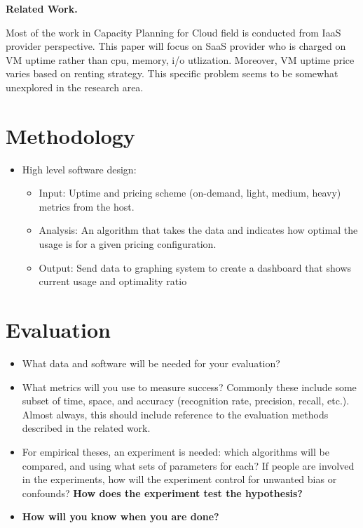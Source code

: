 \documentclass[11pt]{artikel3}
\begin{document}
{\bf Related Work.}

Most of the work in Capacity Planning for Cloud field is conducted from IaaS provider perspective. This paper will focus on SaaS provider who is charged on VM uptime rather than cpu, memory, i/o utlization. Moreover, VM uptime price varies based on renting strategy. This specific problem seems to be somewhat unexplored in the research area.

\section{Methodology}

\begin{itemize}
\item High level software design:
  \begin{itemize}
   \item Input: Uptime and pricing scheme (on-demand, light, medium, heavy) metrics from the host.
   \item Analysis: An algorithm that takes the data and indicates how optimal the usage is for a given pricing configuration.
   \item Output: Send data to graphing system to create a dashboard that shows current usage and optimality ratio
  \end{itemize}
\end{itemize}

\section{Evaluation}

\begin{itemize}
  \item What data and software will be needed for your evaluation? 
  \item What metrics
will you use to measure success? Commonly these include some subset of time, space, and accuracy (recognition rate, precision, recall, etc.).
Almost always, this should include reference to the evaluation methods described in the related work.
  \item For empirical theses, an experiment is needed: which algorithms will be compared, and using what sets of parameters for each? If people are involved in the experiments, how will the experiment control for unwanted bias or confounds? {\bf How does the experiment test the hypothesis?}
  \item {\bf How will you know when you are done?}
\end{itemize}
\end{document}
